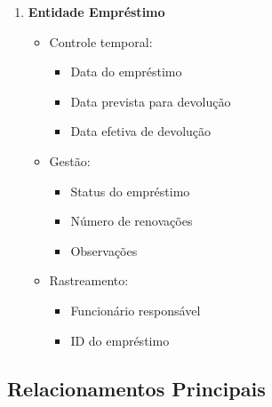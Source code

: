\documentclass[12pt,a4paper]{article}
\begin{document}
\begin{tcolorbox}[title=Elementos do Diagrama]
\begin{enumerate}
    \item \textbf{Entidade Empréstimo}
    \begin{itemize}
        \item Controle temporal:
        \begin{itemize}
            \item Data do empréstimo
            \item Data prevista para devolução
            \item Data efetiva de devolução
        \end{itemize}
        \item Gestão:
        \begin{itemize}
            \item Status do empréstimo
            \item Número de renovações
            \item Observações
        \end{itemize}
        \item Rastreamento:
        \begin{itemize}
            \item Funcionário responsável
            \item ID do empréstimo
        \end{itemize}
    \end{itemize}
\end{enumerate}
\end{tcolorbox}

\subsection{Relacionamentos Principais}
\end{document}
